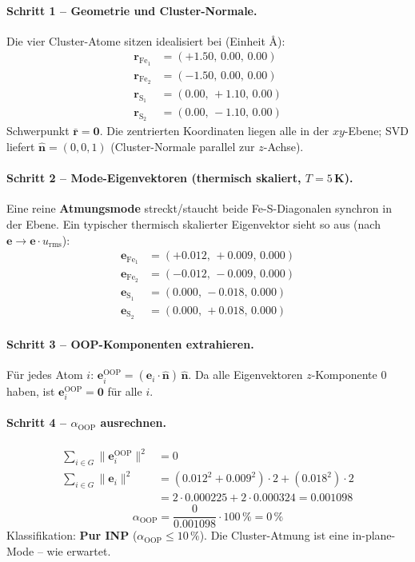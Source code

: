 \documentclass[11pt,a4paper,twoside]{article}
\providecommand{\angstrom}{\text{\AA}}    %
\newcommand{\OOP}{\mathrm{OOP}}
\theoremstyle{remark}
\begin{document}
\paragraph{Schritt 1 -- Geometrie und Cluster-Normale.}
Die vier Cluster-Atome sitzen idealisiert bei (Einheit $\angstrom$):
\begin{align*}
  \mathbf{r}_{\text{Fe}_1} &= (+1.50,\, 0.00,\, 0.00) \\
  \mathbf{r}_{\text{Fe}_2} &= (-1.50,\, 0.00,\, 0.00) \\
  \mathbf{r}_{\text{S}_1}  &= ( 0.00,\, +1.10,\, 0.00) \\
  \mathbf{r}_{\text{S}_2}  &= ( 0.00,\, -1.10,\, 0.00)
\end{align*}
Schwerpunkt $\bar{\mathbf{r}} = \mathbf{0}$. Die zentrierten Koordinaten
liegen alle in der $xy$-Ebene; SVD liefert
$\hat{\mathbf{n}} = (0, 0, 1)$ (Cluster-Normale parallel zur $z$-Achse).

\paragraph{Schritt 2 -- Mode-Eigenvektoren (thermisch skaliert, $T=5$\,K).}
Eine reine \textbf{Atmungsmode} streckt/staucht beide Fe-S-Diagonalen
synchron in der Ebene. Ein typischer thermisch skalierter Eigenvektor
sieht so aus (nach $\mathbf{e} \to \mathbf{e}\cdot u_\text{rms}$):
\begin{align*}
  \mathbf{e}_{\text{Fe}_1} &= (+0.012,\, +0.009,\, 0.000) \\
  \mathbf{e}_{\text{Fe}_2} &= (-0.012,\, -0.009,\, 0.000) \\
  \mathbf{e}_{\text{S}_1}  &= ( 0.000,\, -0.018,\, 0.000) \\
  \mathbf{e}_{\text{S}_2}  &= ( 0.000,\, +0.018,\, 0.000)
\end{align*}

\paragraph{Schritt 3 -- OOP-Komponenten extrahieren.}
F\"ur jedes Atom $i$:
$\mathbf{e}_i^\text{OOP} = (\mathbf{e}_i \cdot \hat{\mathbf{n}})\,
\hat{\mathbf{n}}$. Da alle Eigenvektoren $z$-Komponente $0$ haben,
ist $\mathbf{e}_i^\text{OOP} = \mathbf{0}$ f\"ur alle $i$.

\paragraph{Schritt 4 -- $\alpha_{\OOP}$ ausrechnen.}
\begin{align*}
  \sum_{i \in G} \|\mathbf{e}_i^\text{OOP}\|^2 &= 0 \\
  \sum_{i \in G} \|\mathbf{e}_i\|^2 &= (0.012^2 + 0.009^2)\cdot 2 + (0.018^2)\cdot 2 \\
   &= 2\cdot 0.000225 + 2\cdot 0.000324 = 0.001098
\end{align*}
\begin{equation*}
  \alpha_{\OOP} = \frac{0}{0.001098}\cdot 100\,\% = 0\,\%
\end{equation*}
Klassifikation: \textbf{Pur INP} ($\alpha_{\OOP} \leq 10\,\%$). Die
Cluster-Atmung ist eine in-plane-Mode -- wie erwartet.
\end{document}
